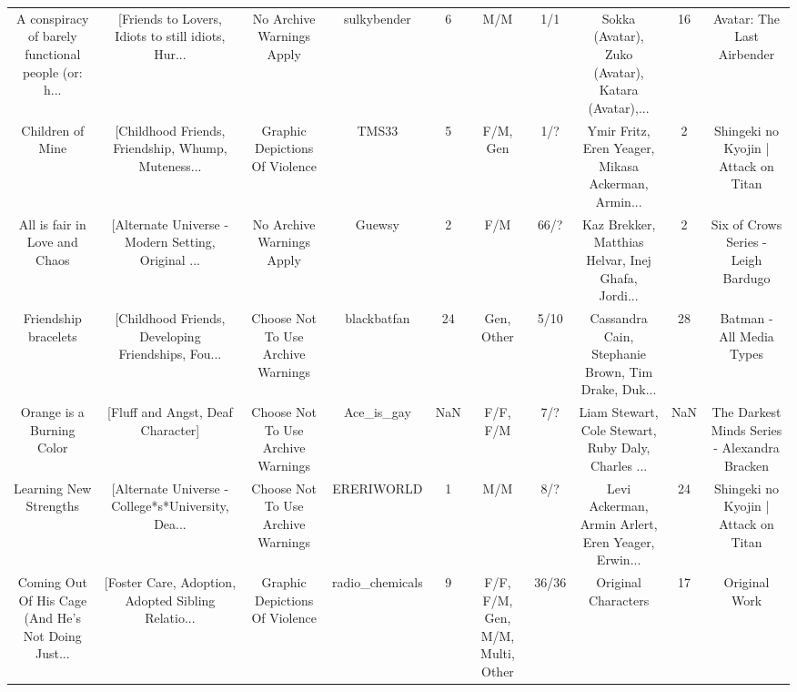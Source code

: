 \begin{table}[h!]
{\begin{tabular}{|c|c|c|c|c|c|c|c|c|c|}
A conspiracy of barely functional people (or: h... & [Friends to Lovers, Idiots to still idiots, Hur... &                          No Archive Warnings Apply &                        sulkybender &         6 &                              M/M &      1/1 & Sokka (Avatar), Zuko (Avatar), Katara (Avatar),... &       16 &                         Avatar: The Last Airbender \\
                                  Children of Mine & [Childhood Friends, Friendship, Whump, Muteness... &                     Graphic Depictions Of Violence &                              TMS33 &         5 &                         F/M, Gen &      1/? & Ymir Fritz, Eren Yeager, Mikasa Ackerman, Armin... &        2 &               Shingeki no Kyojin | Attack on Titan \\
                     All is fair in Love and Chaos & [Alternate Universe - Modern Setting, Original ... &                          No Archive Warnings Apply &                             Guewsy &         2 &                              F/M &     66/? & Kaz Brekker, Matthias Helvar, Inej Ghafa, Jordi... &        2 &                Six of Crows Series - Leigh Bardugo \\
                              Friendship bracelets & [Childhood Friends, Developing Friendships, Fou... &                 Choose Not To Use Archive Warnings &                        blackbatfan &        24 &                       Gen, Other &     5/10 & Cassandra Cain, Stephanie Brown, Tim Drake, Duk... &       28 &                           Batman - All Media Types \\
                         Orange is a Burning Color &                  [Fluff and Angst, Deaf Character] &                 Choose Not To Use Archive Warnings &                         Ace\_is\_gay &       NaN &                         F/F, F/M &      7/? & Liam Stewart, Cole Stewart, Ruby Daly, Charles ... &      NaN &       The Darkest Minds Series - Alexandra Bracken \\
                            Learning New Strengths & [Alternate Universe - College*s*University, Dea... &                 Choose Not To Use Archive Warnings &                         ERERIWORLD &         1 &                              M/M &      8/? & Levi Ackerman, Armin Arlert, Eren Yeager, Erwin... &       24 &               Shingeki no Kyojin | Attack on Titan \\
Coming Out Of His Cage (And He's Not Doing Just... & [Foster Care, Adoption, Adopted Sibling Relatio... &                     Graphic Depictions Of Violence &                    radio\_chemicals &         9 & F/F, F/M, Gen, M/M, Multi, Other &    36/36 &                                Original Characters &       17 &                                      Original Work \\

\end{tabular}}
\end{table}
